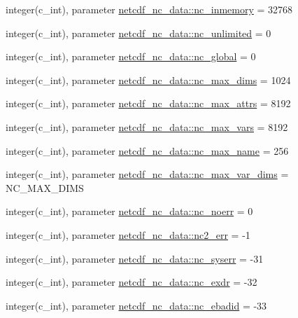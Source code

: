 \begin{DoxyCompactItemize}
\item 
integer(c\+\_\+int), parameter \hyperlink{namespacenetcdf__nc__data_a6590b555133bf817e31e28aee20f9393}{netcdf\+\_\+nc\+\_\+data\+::nc\+\_\+inmemory} = 32768
\item 
integer(c\+\_\+int), parameter \hyperlink{namespacenetcdf__nc__data_a81d34a59d48d58dcb6e72304443038de}{netcdf\+\_\+nc\+\_\+data\+::nc\+\_\+unlimited} = 0
\item 
integer(c\+\_\+int), parameter \hyperlink{namespacenetcdf__nc__data_a541ff616daf713edea81d32a329af406}{netcdf\+\_\+nc\+\_\+data\+::nc\+\_\+global} = 0
\item 
integer(c\+\_\+int), parameter \hyperlink{namespacenetcdf__nc__data_a2e819b1ec79c2dd57227691eaccb011e}{netcdf\+\_\+nc\+\_\+data\+::nc\+\_\+max\+\_\+dims} = 1024
\item 
integer(c\+\_\+int), parameter \hyperlink{namespacenetcdf__nc__data_afcf42d5e37015eb623102b786b415afd}{netcdf\+\_\+nc\+\_\+data\+::nc\+\_\+max\+\_\+attrs} = 8192
\item 
integer(c\+\_\+int), parameter \hyperlink{namespacenetcdf__nc__data_ad4d20ce818b6e0acf0b12e8b06ecdb60}{netcdf\+\_\+nc\+\_\+data\+::nc\+\_\+max\+\_\+vars} = 8192
\item 
integer(c\+\_\+int), parameter \hyperlink{namespacenetcdf__nc__data_aa2b36a5761a6b83f634fcfb4d2001e3c}{netcdf\+\_\+nc\+\_\+data\+::nc\+\_\+max\+\_\+name} = 256
\item 
integer(c\+\_\+int), parameter \hyperlink{namespacenetcdf__nc__data_afbc621b1c8b5a259fa5c4cb9b1478b1f}{netcdf\+\_\+nc\+\_\+data\+::nc\+\_\+max\+\_\+var\+\_\+dims} = N\+C\+\_\+\+M\+A\+X\+\_\+\+D\+I\+MS
\item 
integer(c\+\_\+int), parameter \hyperlink{namespacenetcdf__nc__data_a0717db7f9709d4adc72382fbe6ac2e28}{netcdf\+\_\+nc\+\_\+data\+::nc\+\_\+noerr} = 0
\item 
integer(c\+\_\+int), parameter \hyperlink{namespacenetcdf__nc__data_ae2af66d271a6023aff95804ef6089c7e}{netcdf\+\_\+nc\+\_\+data\+::nc2\+\_\+err} = -\/1
\item 
integer(c\+\_\+int), parameter \hyperlink{namespacenetcdf__nc__data_a734075baec3c30b66779a3ed76bc241f}{netcdf\+\_\+nc\+\_\+data\+::nc\+\_\+syserr} = -\/31
\item 
integer(c\+\_\+int), parameter \hyperlink{namespacenetcdf__nc__data_ae944e685a97f40d845c01bca24d8b9d2}{netcdf\+\_\+nc\+\_\+data\+::nc\+\_\+exdr} = -\/32
\item 
integer(c\+\_\+int), parameter \hyperlink{namespacenetcdf__nc__data_ae3223e48ebe52d4714f345eb2e168789}{netcdf\+\_\+nc\+\_\+data\+::nc\+\_\+ebadid} = -\/33

\end{DoxyCompactItemize}
